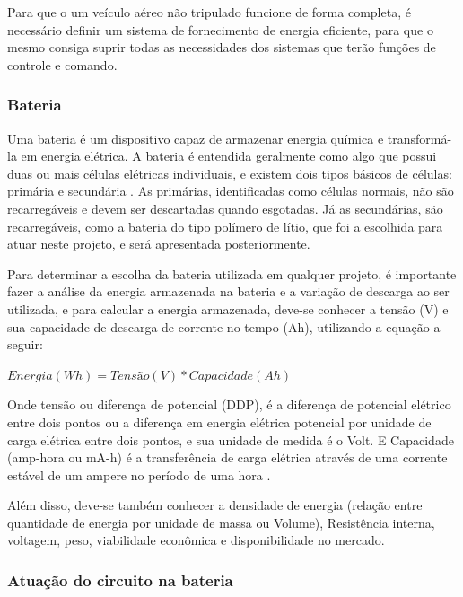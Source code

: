
Para que o um veículo aéreo não tripulado funcione de forma completa, é necessário definir um sistema de fornecimento de energia eficiente, para que o mesmo consiga suprir todas as necessidades dos sistemas que terão funções de controle e comando.

\subsubsection{Bateria}

Uma bateria é um dispositivo capaz de armazenar energia química e transformá-la em energia elétrica. A bateria é entendida geralmente como algo que possui duas ou mais células elétricas individuais, e existem dois tipos básicos de células: primária e secundária \cite{gibbs}. As primárias, identificadas como células normais, não são recarregáveis e devem ser descartadas quando esgotadas. Já as secundárias, são recarregáveis, como a bateria do tipo polímero de lítio, que foi a escolhida para atuar neste projeto, e será apresentada posteriormente. 

Para determinar a escolha da bateria utilizada em qualquer projeto, é importante fazer a análise  da energia armazenada na bateria e a variação de descarga ao ser utilizada, e para calcular a energia armazenada, deve-se conhecer a tensão (V) e sua capacidade de descarga de corrente no tempo (Ah), utilizando a equação a seguir: \cite{peixoto}

$Energia(Wh)= Tensão(V)*Capacidade(Ah)$

Onde tensão ou diferença de potencial (DDP), é a diferença de potencial elétrico entre dois pontos ou a diferença em energia elétrica potencial por unidade de carga elétrica entre dois pontos, e sua unidade de medida é o Volt. E Capacidade (amp-hora ou mA-h) é a transferência de carga elétrica através de uma corrente estável de um ampere no período de uma hora \cite{gibbs}.

Além disso, deve-se também conhecer a densidade de energia (relação entre quantidade de energia por unidade de massa ou Volume), Resistência interna, voltagem, peso, viabilidade econômica e disponibilidade no mercado.


\subsubsection{Atuação do circuito na bateria}

